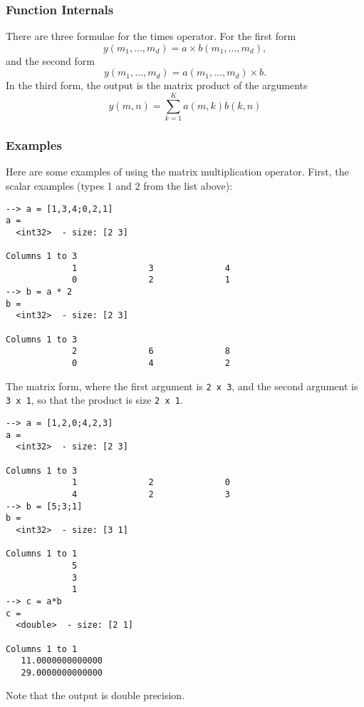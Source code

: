 \subsubsection{Function Internals}
There are three formulae for the times operator.  For the first form
\[
y(m_1,\ldots,m_d) = a \times b(m_1,\ldots,m_d),
\]
and the second form
\[
y(m_1,\ldots,m_d) = a(m_1,\ldots,m_d) \times b.
\]
In the third form, the output is the matrix product of the arguments
\[
y(m,n) = \sum_{k=1}^{K} a(m,k) b(k,n)
\]
\subsubsection{Examples}
Here are some examples of using the matrix multiplication operator.  First,
the scalar examples (types 1 and 2 from the list above):
\begin{verbatim}
--> a = [1,3,4;0,2,1]
a =
  <int32>  - size: [2 3]
  
Columns 1 to 3
             1              3              4
             0              2              1
--> b = a * 2
b =
  <int32>  - size: [2 3]
  
Columns 1 to 3
             2              6              8
             0              4              2
\end{verbatim}
The matrix form, where the first argument is \verb|2 x 3|, and the
second argument is \verb|3 x 1|, so that the product is size 
\verb|2 x 1|.
\begin{verbatim}
--> a = [1,2,0;4,2,3]
a =
  <int32>  - size: [2 3]
  
Columns 1 to 3
             1              2              0
             4              2              3
--> b = [5;3;1]
b =
  <int32>  - size: [3 1]
  
Columns 1 to 1
             5
             3
             1
--> c = a*b
c =
  <double>  - size: [2 1]
  
Columns 1 to 1
   11.0000000000000
   29.0000000000000
\end{verbatim}
Note that the output is double precision.
